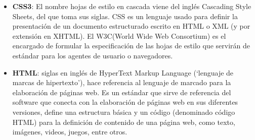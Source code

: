 \begin{itemize}
		
	\item \textbf{CSS3}: El nombre hojas de estilo en cascada viene del inglés Cascading Style Sheets, del que toma sus siglas. CSS es un lenguaje usado para definir la presentación de un documento estructurado escrito en HTML o XML (y por extensión en XHTML). El W3C(World Wide Web Consortium) es el encargado de formular la especificación de las hojas de estilo que servirán de estándar para los agentes de usuario o navegadores\cite{CSS3}.
	
	\item \textbf{HTML}: siglas en inglés de HyperText Markup Language (‘lenguaje de marcas de hipertexto’), hace referencia al lenguaje de marcado para la elaboración de páginas web. Es un estándar que sirve de referencia del software que conecta con la elaboración de páginas web en sus diferentes versiones, define una estructura básica y un código (denominado código HTML) para la definición de contenido de una página web, como texto, imágenes, videos, juegos, entre otros\cite{HTML}.
	
\end{itemize}